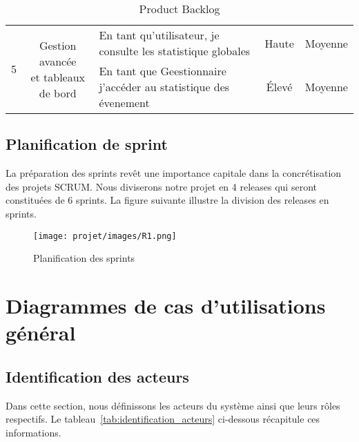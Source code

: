 \begin{table}[h!]
\begin{tabular}{|c|c|m{7cm}|c|c|}
\hline
\multirow{3}{*}{5} & \multirow{3}{*}{\parbox{3cm}{\centering Gestion avancée \\et tableaux de bord }} 
& En tant qu’utilisateur, je consulte les statistique globales & Haute  & Moyenne \\
\cline{3-5}
& & En tant que Geestionnaire j'accéder au statistique des évenement  & Élevé & Moyenne \\
\cline{3-5}
\hline
\end{tabular}
\caption{Product Backlog}
\end{table}

\clearpage
\subsection{Planification de sprint}
La préparation des sprints revêt une importance capitale dans la concrétisation des projets
SCRUM. Nous diviserons notre projet en 4 releases qui seront constituées de 6 sprints. La figure
suivante illustre la division des releases en sprints.
\begin{figure}[H]
    \centering
    \texttt{[image: projet/images/R1.png]}
    \caption{Planification des sprints}
    \label{fig:equipe_scrum}
 \end{figure}

\section{Diagrammes de cas d'utilisations général}

\subsection{Identification des acteurs}

Dans cette section, nous définissons les acteurs du système ainsi que leurs rôles respectifs. Le tableau~\ref{tab:identification_acteurs} ci-dessous récapitule ces informations.

